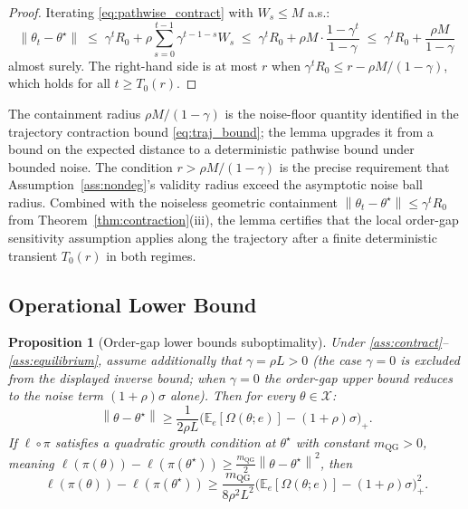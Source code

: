 \documentclass[12pt,a4paper]{article}
\newtheorem{proposition}[definition]{Proposition}
\newcommand{\X}{\mathcal{X}}
\newcommand{\norm}[1]{\left\lVert#1\right\rVert}
\newcommand{\Ogap}{\Omega}
\begin{document}
\begin{proof}
Iterating \eqref{eq:pathwise_contract} with $W_s \leq M$ a.s.:
\[
  \norm{\theta_t - \theta^\star}
  \;\leq\; \gamma^t R_0 + \rho \sum_{s=0}^{t-1} \gamma^{t-1-s} W_s
  \;\leq\; \gamma^t R_0 + \rho M \cdot \frac{1 - \gamma^t}{1 - \gamma}
  \;\leq\; \gamma^t R_0 + \frac{\rho M}{1 - \gamma}
\]
almost surely. The right-hand side is at most $r$ when
$\gamma^t R_0 \leq r - \rho M/(1-\gamma)$, which holds for all
$t \geq T_0(r)$. \qedhere
\end{proof}

The containment radius $\rho M/(1-\gamma)$ is the noise-floor quantity
identified in the trajectory contraction bound \eqref{eq:traj_bound}; the
lemma upgrades it from a bound on the expected distance to a deterministic
pathwise bound under bounded noise. The condition $r > \rho M/(1-\gamma)$ is
the precise requirement that Assumption~\ref{ass:nondeg}'s validity radius
exceed the asymptotic noise ball radius. Combined with the noiseless
geometric containment $\norm{\theta_t - \theta^\star} \leq \gamma^t R_0$ from
Theorem~\ref{thm:contraction}(iii), the lemma certifies that the local
order-gap sensitivity assumption applies along the trajectory after a finite
deterministic transient $T_0(r)$ in both regimes.

\subsection{Operational Lower Bound}
\label{sec:theory_lowerbound}

\begin{proposition}[Order-gap lower bounds suboptimality]
\label{prop:lowerbound}
Under \ref{ass:contract}--\ref{ass:equilibrium}, assume additionally that
$\gamma = \rho L > 0$ (the case $\gamma = 0$ is excluded from the displayed
inverse bound; when $\gamma = 0$ the order-gap upper bound reduces to the
noise term $(1+\rho)\sigma$ alone). Then for every $\theta \in \X$:
\begin{equation}
\label{eq:dist_bound}
\norm{\theta - \theta^\star}
\geq \frac{1}{2\rho L}
      \bigl(\mathbb{E}_e[\Ogap(\theta; e)] - (1+\rho)\sigma\bigr)_+.
\end{equation}
If $\ell \circ \pi$ satisfies a \emph{quadratic growth} condition at
$\theta^\star$ with constant $m_{\mathrm{QG}} > 0$, meaning
$\ell(\pi(\theta)) - \ell(\pi(\theta^\star)) \geq
\tfrac{m_{\mathrm{QG}}}{2} \norm{\theta - \theta^\star}^2$, then
\begin{equation}
\label{eq:qg_bound}
\ell(\pi(\theta)) - \ell(\pi(\theta^\star))
\geq \frac{m_{\mathrm{QG}}}{8\rho^2 L^2}
      \bigl(\mathbb{E}_e[\Ogap(\theta; e)] - (1+\rho)\sigma\bigr)_+^2.
\end{equation}
\end{proposition}
\end{document}
